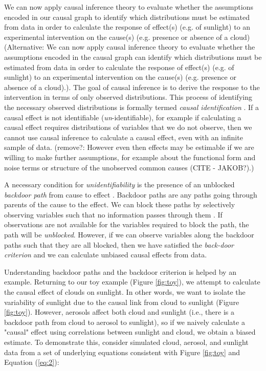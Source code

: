 \documentclass[12pt]{article}
\begin{document}
We can now apply causal inference theory
\citep[e.g.,][]{pearl1995causal,shpitser2006} to evaluate whether the
assumptions encoded in our causal graph to identify which
distributions must be estimated from data in order to calculate the
response of effect(s) (e.g. of sunlight) to an experimental
intervention on the cause(s) (e.g. presence or absence of a cloud)
(Alternative: We can now apply causal inference theory
\citep[e.g.,][]{pearl1995causal,tian2002general} to evaluate whether
the assumptions encoded in the causal graph can identify which
distributions must be estimated from data in order to calculate the
response of effect(s) (e.g. of sunlight) to an experimental
intervention on the cause(s) (e.g. presence or absence of a
cloud).). The goal of causal inference is to derive the response to
the intervention in terms of only observed distributions. This process
of identifying the necessary observed distributions is formally termed
\emph{causal identification} \citep[][, Ch. 3]{pearl2009causality}. If
a causal effect is not identifiable (\emph{un}-identifiable), for
example if calculating a causal effect requires distributions of
variables that we do not observe, then we cannot use causal inference
to calculate a causal effect, even with an infinite sample of
data. (remove?: However even then effects may be estimable if we are
willing to make further assumptions, for example about the functional
form and noise terms or structure of the unobserved common causes
(CITE - JAKOB?).)

A necessary condition for \emph{unidentifiability} is the presence of
an unblocked \emph{backdoor path} from cause to effect \citep[][,
Ch. 3]{pearl2009causality}. Backdoor paths are any paths going
through parents of the cause to the effect. We can block these paths
by selectively observing variables such that no information passes
through them \citep{geiger-d-sep}. If observations are not available
for the variables required to block the path, the path will be
\emph{unblocked}. However, if we can observe variables along the
backdoor paths such that they are all blocked, then we have satisfied
the \emph{back-door criterion} \citep{pearl2009} and we can calculate
unbiased causal effects from data.

Understanding backdoor paths and the backdoor criterion is helped by
an example. Returning to our toy example (Figure \ref{fig:toy}), we
attempt to calculate the causal effect of clouds on sunlight. In other
words, we want to isolate the variability of sunlight due to the
causal link from cloud to sunlight (Figure \ref{fig:toy}). However,
aerosols affect both cloud and sunlight (i.e., there is a backdoor
path from cloud to aerosol to sunlight), so if we naively calculate a
"causal" effect using correlations between sunlight and cloud, we obtain
a biased estimate. To demonstrate this, consider simulated cloud,
aerosol, and sunlight data from a set of underlying equations
consistent with Figure \ref{fig:toy} and Equation (\ref{eq:2}):
\end{document}
